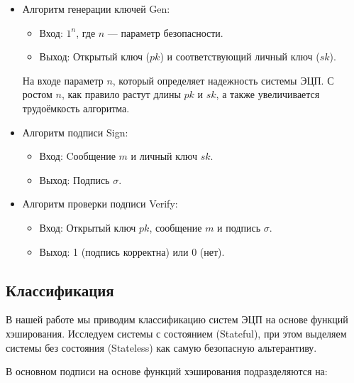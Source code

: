 \documentclass[a4paper, 14pt]{extarticle}
\begin{document}
\begin{itemize}
    \item Алгоритм генерации ключей Gen:

    \begin{itemize}
        \item Вход: $1^{n}$, где $n$ --- параметр безопасности.
        \item Выход: Открытый ключ ($pk$) и соответствующий личный ключ ($sk$).
    \end{itemize}

    На входе параметр $n$, который определяет надежность системы ЭЦП. С ростом $n$, как правило растут длины $pk$ и $sk$, а также увеличивается трудоёмкость алгоритма.

    \item Алгоритм подписи Sign:

    \begin{itemize}
        \item Вход: Cообщение $m$ и личный ключ $sk$.
        \item Выход: Подпись $\sigma$.
    \end{itemize}

    \item Алгоритм проверки подписи Verify:

    \begin{itemize}
        \item Вход: Открытый ключ $pk$, сообщение $m$ и подпись $\sigma$.
        \item Выход: 1 (подпись корректна) или 0 (нет).
    \end{itemize}
\end{itemize}

\subsection{Классификация}
В нашей работе мы приводим классификацию систем ЭЦП на основе функций хэширования. Исследуем системы с состоянием (Stateful), при этом выделяем системы без состояния (Stateless) как самую безопасную альтерантиву.\newline

В основном подписи на основе функций хэширования подразделяются на:
\end{document}
